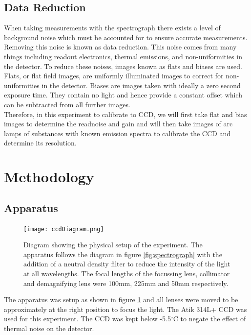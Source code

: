 \documentclass[a4paper,12pt,twocolumn]{article}
\let\cite=\supercite
\begin{document}
		\subsection{Data Reduction}
			When taking measurements with the spectrograph there exists a level of background noise which must be accounted for to ensure accurate measurements. Removing this noise is known as data reduction\cite{manual}. This noise comes from many things including readout electronics, thermal emissions, and non-uniformities in the detector\cite{astropy}. To reduce these noises, images known as flats and biases are used. Flats, or flat field images, are uniformly illuminated images to correct for non-uniformities in the detector. Biases are images taken with ideally a zero second exposure time. They contain no light and hence provide a constant offset which can be subtracted from all further images.\\
			
		Therefore, in this experiment to calibrate to CCD, we will first take flat and bias images to determine the readnoise and gain and will then take images of arc lamps of substances with known emission spectra to calibrate the CCD and determine its resolution.
	
	\section{Methodology}
		\subsection{Apparatus}
			\begin{figure}
				\texttt{[image: ccdDiagram.png]}
				\captionsetup{font=scriptsize}
				\caption{Diagram showing the physical setup of the experiment\cite{manual}. The apparatus follows the diagram in figure \ref{fig:spectrograph} with the addition of a neutral density filter to reduce the intensity of the light at all wavelengths. The focal lengths of the focussing lens, collimator and demagnifying lens were 100mm, 225mm and 50mm respectively.}
				\label{fig:apparatus}
			\end{figure}
		
			The apparatus was setup as shown in figure \ref{fig:apparatus} and all lenses were moved to be approximately at the right position to focus the light. The Atik 314L+ CCD was used for this experiment. The CCD was kept below -5.5$^{\circ}$C to negate the effect of thermal noise on the detector.
	
\end{document}
